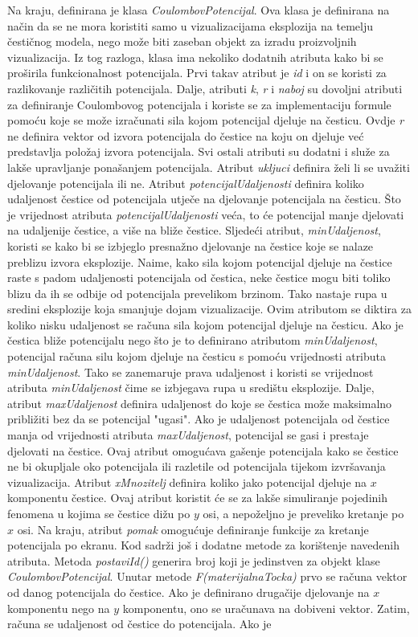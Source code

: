 \documentclass{foi}
\begin{document}
Na kraju, definirana je klasa \textit{CoulombovPotencijal}. Ova klasa je definirana na način da se ne mora koristiti samo u vizualizacijama eksplozija na temelju čestičnog modela, nego može biti zaseban objekt za izradu proizvoljnih vizualizacija. Iz tog razloga, klasa ima nekoliko dodatnih atributa kako bi se proširila funkcionalnost potencijala. Prvi takav atribut je \textit{id} i on se koristi za razlikovanje različitih potencijala. Dalje, atributi \textit{k}, \textit{r} i \textit{naboj} su dovoljni atributi za definiranje Coulombovog potencijala i koriste se za implementaciju formule pomoću koje se može izračunati sila kojom potencijal djeluje na česticu. Ovdje \textit{r} ne definira vektor od izvora potencijala do čestice na koju on djeluje već predstavlja položaj izvora potencijala. Svi ostali atributi su dodatni i služe za lakše upravljanje ponašanjem potencijala. Atribut \textit{ukljuci} definira želi li se uvažiti djelovanje potencijala ili ne. Atribut \textit{potencijalUdaljenosti} definira koliko udaljenost čestice od potencijala utječe na djelovanje potencijala na česticu. Što je vrijednost atributa \textit{potencijalUdaljenosti} veća, to će potencijal manje djelovati na udaljenije čestice, a više na bliže čestice. Sljedeći atribut, \textit{minUdaljenost}, koristi se kako bi se izbjeglo presnažno djelovanje na čestice koje se nalaze preblizu izvora eksplozije. Naime, kako sila kojom potencijal djeluje na čestice raste s padom udaljenosti potencijala od čestica, neke čestice mogu biti toliko blizu da ih se odbije od potencijala prevelikom brzinom. Tako nastaje rupa u sredini eksplozije koja smanjuje dojam vizualizacije. Ovim atributom se diktira za koliko nisku udaljenost se računa sila kojom potencijal djeluje na česticu. Ako je čestica bliže potencijalu nego što je to definirano atributom \textit{minUdaljenost}, potencijal računa silu kojom djeluje na česticu s pomoću vrijednosti atributa \textit{minUdaljenost}. Tako se zanemaruje prava udaljenost i koristi se vrijednost atributa \textit{minUdaljenost} čime se izbjegava rupa u središtu eksplozije. Dalje, atribut \textit{maxUdaljenost} definira udaljenost do koje se čestica može maksimalno približiti bez da se potencijal "ugasi". Ako je udaljenost potencijala od čestice manja od vrijednosti atributa \textit{maxUdaljenost}, potencijal se gasi i prestaje djelovati na čestice. Ovaj atribut omogućava gašenje potencijala kako se čestice ne bi okupljale oko potencijala ili razletile od potencijala tijekom izvršavanja vizualizacija. Atribut \textit{xMnozitelj} definira koliko jako potencijal djeluje na $x$ komponentu čestice. Ovaj atribut koristit će se za lakše simuliranje pojedinih fenomena u kojima se čestice dižu po $y$ osi, a nepoželjno je preveliko kretanje po $x$ osi. Na kraju, atribut \textit{pomak} omogućuje definiranje funkcije za kretanje potencijala po ekranu. Kod sadrži još i dodatne metode za korištenje navedenih atributa. Metoda \textit{postaviId()} generira broj koji je jedinstven za objekt klase \textit{CoulombovPotencijal}. Unutar metode \textit{F(materijalnaTocka)} prvo se računa vektor od danog potencijala do čestice. Ako je definirano drugačije djelovanje na $x$ komponentu nego na $y$ komponentu, ono se uračunava na dobiveni vektor. Zatim, računa se udaljenost od čestice do potencijala. Ako je 
\end{document}
